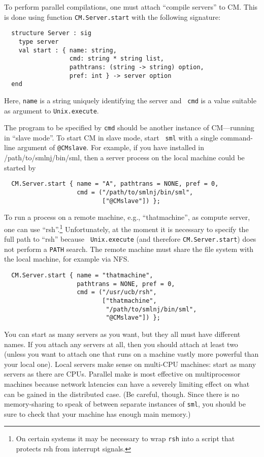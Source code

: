 \documentclass{article}
\begin{document}
To perform parallel compilations, one must attach ``compile servers'' to
CM.  This is done using function {\tt CM.Server.start} with the following
signature:

\begin{verbatim}
  structure Server : sig
    type server
    val start : { name: string,
                  cmd: string * string list,
                  pathtrans: (string -> string) option,
                  pref: int } -> server option
  end
\end{verbatim}

Here, {\tt name} is a string uniquely identifying the server and {\tt
cmd} is a value suitable as argument to {\tt Unix.execute}.

The program to be specified by {\tt cmd} should be another instance of
CM---running in ``slave mode''.  To start CM in slave mode, start {\tt
sml} with a single command-line argument of {\tt @CMslave}.  For
example, if you have installed in /path/to/smlnj/bin/sml, then a
server process on the local machine could be started by

\begin{verbatim}
  CM.Server.start { name = "A", pathtrans = NONE, pref = 0,
                    cmd = ("/path/to/smlnj/bin/sml",
                           ["@CMslave"]) };
\end{verbatim}

To run a process on a remote machine, e.g., ``thatmachine'', as
compute server, one can use ``rsh''.\footnote{On certain systems it
may be necessary to wrap {\tt rsh} into a script that protects rsh
from interrupt signals.}  Unfortunately, at the moment it
is necessary to specify the full path to ``rsh'' because {\tt
Unix.execute} (and therefore {\tt CM.Server.start}) does not perform
a {\tt PATH} search. The remote machine
must share the file system with the local machine, for example via NFS.

\begin{verbatim}
  CM.Server.start { name = "thatmachine",
                    pathtrans = NONE, pref = 0,
                    cmd = ("/usr/ucb/rsh",
                           ["thatmachine",
                            "/path/to/smlnj/bin/sml",
                            "@CMslave"]) };
\end{verbatim}

You can start as many servers as you want, but they all must have
different names.  If you attach any servers at all, then you should
attach at least two (unless you want to attach one that runs on a
machine vastly more powerful than your local one).  Local servers make
sense on multi-CPU machines: start as many servers as there are CPUs.
Parallel make is most effective on multiprocessor machines because
network latencies can have a severely limiting effect on what can be
gained in the distributed case.
(Be careful, though.  Since there is no memory-sharing to speak of
between separate instances of {\tt sml}, you should be sure to check
that your machine has enough main memory.)
\end{document}
